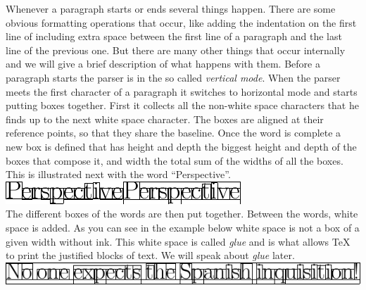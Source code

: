 \documentclass[a4paper]{article}
\begin{document}
Whenever a paragraph starts or ends several things happen. There are some obvious formatting operations that occur, like adding the indentation on the first line of including extra space between the first line of a paragraph and the last line of the previous one. But there are many other things that occur internally and we will give a brief description of what happens with them. Before a paragraph starts the parser is in the so called \emph{vertical mode}. When the parser meets the first character of a paragraph it switches to horizontal mode and starts putting boxes together. First it collects all the non-white space characters that he finds up to the next white space character. The boxes are aligned at their reference points, so that they share the baseline. Once the word is complete a new box is defined that has height and depth the biggest height and depth of the boxes that compose it, and width the total sum of the widths of all the boxes. This is illustrated next with the word ``Perspective''.\\

\noindent\hfil\includegraphics{glympse_figures/word.pdf}\hfil\includegraphics{glympse_figures/word_boxed.pdf}\hfil\\

\noindent The different boxes of the words are then put together. Between the words, white space is added. As you can see in the example below white space is not a box of a given width without ink. This white space is called \emph{glue} and is what allows \TeX{} to print the justified blocks of text. We will speak about \emph{glue} later.\\

\noindent\hfil\includegraphics{glympse_figures/sentence.pdf}\hfil\\
\end{document}
